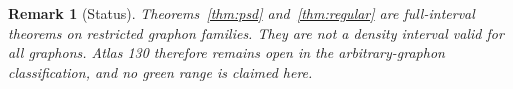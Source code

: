 \documentclass[11pt]{article}
\newtheorem{remark}[theorem]{Remark}
\begin{document}
\begin{remark}[Status]
Theorems~\ref{thm:psd} and~\ref{thm:regular} are full-interval theorems on
restricted graphon families.  They are not a density interval valid for
all graphons.  Atlas 130 therefore remains open in the arbitrary-graphon
classification, and no green range is claimed here.
\end{remark}
\end{document}
